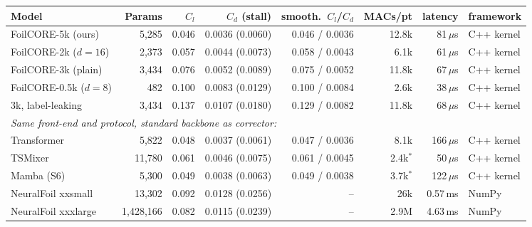 \begin{tabular}{lrrrrrrl}
\toprule
Model & Params & $C_l$ & $C_d$ (stall) & smooth.\ $C_l$/$C_d$ & MACs/pt & latency & framework \\
\midrule
FoilCORE-5k (ours) & 5,285 & 0.046 & 0.0036 (0.0060) & 0.046 / 0.0036 & 12.8k & 81\,$\mu$s & C++ kernel \\
FoilCORE-2k ($d{=}16$) & 2,373 & 0.057 & 0.0044 (0.0073) & 0.058 / 0.0043 & 6.1k & 61\,$\mu$s & C++ kernel \\
FoilCORE-3k (plain) & 3,434 & 0.076 & 0.0052 (0.0089) & 0.075 / 0.0052 & 11.8k & 67\,$\mu$s & C++ kernel \\
FoilCORE-0.5k ($d{=}8$) & 482 & 0.100 & 0.0083 (0.0129) & 0.100 / 0.0084 & 2.6k & 38\,$\mu$s & C++ kernel \\
3k, label-leaking & 3,434 & 0.137 & 0.0107 (0.0180) & 0.129 / 0.0082 & 11.8k & 68\,$\mu$s & C++ kernel \\
\midrule
\multicolumn{8}{l}{\emph{Same front-end and protocol, standard backbone as corrector:}} \\
\quad Transformer & 5,822 & 0.048 & 0.0037 (0.0061) & 0.047 / 0.0036 & 8.1k & 166\,$\mu$s & C++ kernel \\
\quad TSMixer & 11,780 & 0.061 & 0.0046 (0.0075) & 0.061 / 0.0045 & 2.4k$^{\ast}$ & 50\,$\mu$s & C++ kernel \\
\quad Mamba (S6) & 5,300 & 0.049 & 0.0038 (0.0063) & 0.049 / 0.0038 & 3.7k$^{\ast}$ & 122\,$\mu$s & C++ kernel \\
\midrule
NeuralFoil xxsmall & 13,302 & 0.092 & 0.0128 (0.0256) & -- & 26k & 0.57\,ms & NumPy \\
NeuralFoil xxxlarge & 1,428,166 & 0.082 & 0.0115 (0.0239) & -- & 2.9M & 4.63\,ms & NumPy \\
\bottomrule
\end{tabular}
